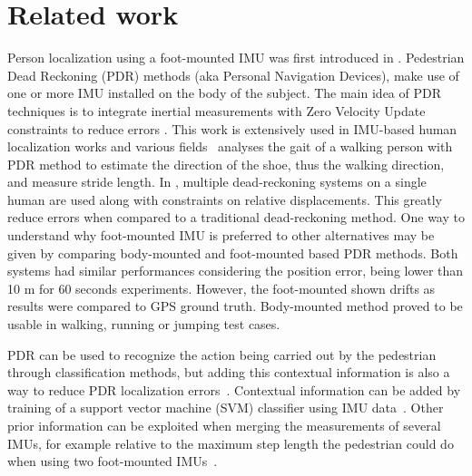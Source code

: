 
\section{Related work}\label{sec:relatedWork}

Person localization using a foot-mounted IMU was first introduced in \cite{hutchings1998system}. 
Pedestrian Dead Reckoning (PDR) methods (aka Personal Navigation Devices), make use of one or more IMU installed on the body of the subject.
The main idea of PDR techniques is to integrate inertial measurements with Zero Velocity Update constraints to reduce errors \cite{ojeda2007personal}.
This work is extensively used in IMU-based human localization works and various fields~\cite{kwanmuang2015phd} analyses the gait of a walking person 
with PDR method to estimate the direction of the shoe, thus the walking direction, and measure stride length. In \cite{jin2011robust}, multiple dead-reckoning systems on a single human
are used along with constraints on relative displacements. This greatly reduce errors when compared to a traditional dead-reckoning method. 
One way to understand why foot-mounted IMU is preferred to other alternatives may be given by \cite{groves2007inertial} comparing body-mounted and foot-mounted based PDR methods. 
Both systems had similar performances considering the position error, being lower than 10 m for 60 seconds experiments. However, the foot-mounted shown drifts as results were compared
to GPS ground truth. Body-mounted method proved to be usable in walking, running or jumping test cases.


PDR can be used to recognize the action being carried out by the pedestrian through classification methods, but adding this contextual information is also a way to reduce PDR localization errors~\cite{kourogi2010method,panahandeh2012chest}. 
Contextual information can be added by training of a support vector machine (SVM) classifier using IMU data~\cite{wagstaff2017improving}.
Other prior information can be exploited when merging the measurements of several IMUs, for example relative to the maximum step length the pedestrian could do when using two foot-mounted IMUs~\cite{skog2012fusing}.

